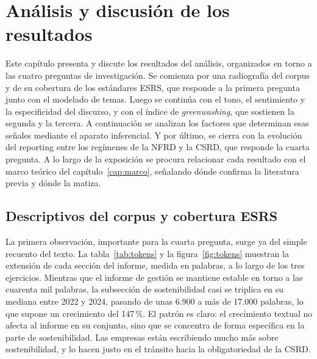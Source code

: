 \chapter{Análisis y discusión de los resultados}
\label{cap:resultados}

Este capítulo presenta y discute los resultados del análisis, organizados en torno a las cuatro
preguntas de investigación. Se comienza por una radiografía del corpus y de su cobertura de los
estándares ESRS, que responde a la primera pregunta junto con el modelado de temas. Luego se continúa
con el tono, el sentimiento y la especificidad del discurso, y con el índice de
\textit{greenwashing}, que sostienen la segunda y la tercera. A continuación se analizan los factores
que determinan esas señales mediante el aparato inferencial. Y por último, se cierra con la evolución del
reporting entre los regímenes de la NFRD y la CSRD, que responde la cuarta pregunta. A lo largo de la exposición se procura
relacionar cada resultado con el marco teórico del capítulo~\ref{cap:marco}, señalando dónde
confirma la literatura previa y dónde la matiza.

\section{Descriptivos del corpus y cobertura ESRS}
\label{sec:res-descriptivos}

La primera observación, importante para la cuarta pregunta, surge ya del simple recuento
del texto. La tabla~\ref{tab:tokens} y la figura~\ref{fig:tokens} muestran la extensión de cada
sección del informe, medida en palabras, a lo largo de los tres ejercicios. Mientras que el
informe de gestión se mantiene estable en torno a las cuarenta mil palabras, la subsección de
sostenibilidad casi se triplica en su mediana entre 2022 y 2024, pasando de unas 6.900 a más de
17.000 palabras, lo que supone un crecimiento del 147\,\%. El patrón es claro: el
crecimiento textual no afecta al informe en su conjunto, sino que se concentra de forma
específica en la parte de sostenibilidad. Las empresas están escribiendo mucho más sobre
sostenibilidad, y lo hacen justo en el tránsito hacia la obligatoriedad de la CSRD.

